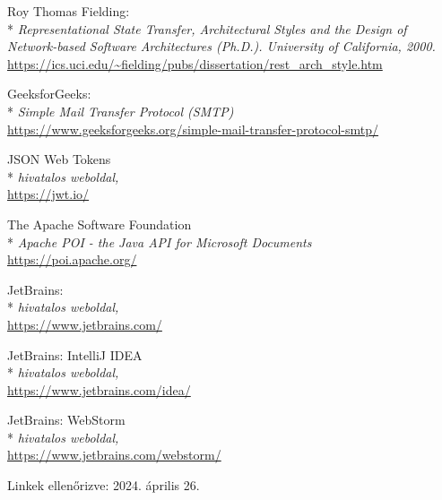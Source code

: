 \begin{thebibliography}{x}
 Roy Thomas Fielding:\\*
\textit{Representational State Transfer,
Architectural Styles and the Design of Network-based Software Architectures (Ph.D.).
University of California,
2000.}
\\ \url{https://ics.uci.edu/~fielding/pubs/dissertation/rest_arch_style.htm}

 GeeksforGeeks: \\*
\textit{Simple Mail Transfer Protocol (SMTP)}
\\ \url{https://www.geeksforgeeks.org/simple-mail-transfer-protocol-smtp/}

 JSON Web Tokens\\*
\textit{hivatalos weboldal,}
\\ \url{https://jwt.io/}

 The Apache Software Foundation\\*
\textit{Apache POI - the Java API for Microsoft Documents}
\\ \url{https://poi.apache.org/}

 JetBrains:\\*
\textit{hivatalos weboldal,}
\\ \url{https://www.jetbrains.com/}

 JetBrains: IntelliJ IDEA\\*
\textit{hivatalos weboldal,}
\\ \url{https://www.jetbrains.com/idea/}

 JetBrains: WebStorm\\*
\textit{hivatalos weboldal,}
\\ \url{https://www.jetbrains.com/webstorm/}

\end{thebibliography}

Linkek ellenőrizve: 2024. április 26.